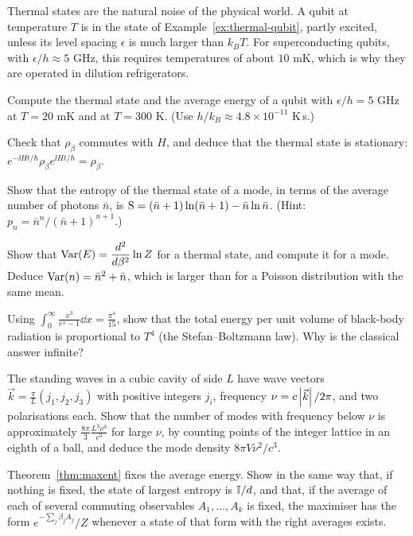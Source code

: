 \begin{lookahead}
  Thermal states are the natural noise of the physical world. A qubit at temperature $T$ is in the state of Example~\ref{ex:thermal-qubit}, partly excited, unless its level spacing $\epsilon$ is much larger than $k_BT$. For superconducting qubits, with $\epsilon/h\approx5$ GHz, this requires temperatures of about $10$ mK, which is why they are operated in dilution refrigerators.
\end{lookahead}

\begin{exerciseset}
   Compute the thermal state and the average energy of a qubit with $\epsilon/h=5$ GHz at $T=20$ mK and at $T=300$ K. (Use $h/k_B\approx4.8\times10^{-11}$ K\,s.)

   Check that $\rho_\beta$ commutes with $H$, and deduce that the thermal state is stationary: $e^{-\ii Ht/\hbar}\rho_\beta e^{\ii Ht/\hbar}=\rho_\beta$.

   Show that the entropy of the thermal state of a mode, in terms of the average number of photons $\bar n$, is $\mathrm{S}=(\bar n+1)\ln(\bar n+1)-\bar n\ln\bar n$. (Hint: $p_n=\bar n^n/(\bar n+1)^{n+1}$.)

   Show that $\operatorname{Var}(E)=\dfrac{d^2}{d\beta^2}\ln Z$ for a thermal state, and compute it for a mode. Deduce $\operatorname{Var}(n)=\bar n^2+\bar n$, which is larger than for a Poisson distribution with the same mean.

   Using $\int_0^\infty\frac{x^3}{e^x-1}\dd x=\frac{\pi^4}{15}$, show that the total energy per unit volume of black-body radiation is proportional to $T^4$ (the Stefan--Boltzmann law). Why is the classical answer infinite?

  \label{ex:mode-count} The standing waves in a cubic cavity of side $L$ have wave vectors $\vec k=\tfrac\pi L(j_1,j_2,j_3)$ with positive integers $j_i$, frequency $\nu=c\left|\vec k\right|/2\pi$, and two polarisations each. Show that the number of modes with frequency below $\nu$ is approximately $\frac{8\pi}{3}\frac{L^3\nu^3}{c^3}$ for large $\nu$, by counting points of the integer lattice in an eighth of a ball, and deduce the mode density $8\pi V\nu^2/c^3$.

   Theorem~\ref{thm:maxent} fixes the average energy. Show in the same way that, if nothing is fixed, the state of largest entropy is $\mathbb{I}/d$, and that, if the average of each of several commuting observables $A_1,\dots,A_k$ is fixed, the maximiser has the form $e^{-\sum_j\beta_jA_j}/Z$ whenever a state of that form with the right averages exists.
\end{exerciseset}
